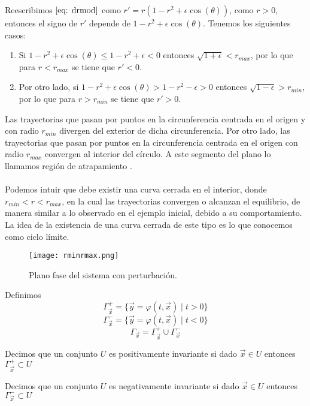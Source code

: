 Reescribimos $\eqref{eq: drmod}$ como $r'=r(1-r^2+\epsilon \cos(\theta))$, como $r>0$,
entonces el signo de $r'$ depende de $1-r^2+\epsilon \cos(\theta)$.
Tenemos los siguientes casos:

\begin{enumerate}
	\item Si $1-r^2+\epsilon\cos(\theta)\leq 1-r^2+\epsilon<0$
	      entonces $\sqrt{1+\epsilon}<r_{max}$, por lo que para $r<r_{max}$ se tiene que $r'<0$.
	\item Por otro lado, si	$1-r^2+\epsilon\cos(\theta)>1-r^2-\epsilon>0$
	      entonces $\sqrt{1-\epsilon}>r_{min}$, por lo que para $r>r_{min}$ se tiene que $r'>0$.
\end{enumerate}

Las trayectorias que pasan por puntos en la circunferencia centrada
en el origen y con radio $r_{min}$
divergen del exterior de dicha circunferencia. Por otro lado,
las trayectorias que pasan por puntos en la circunferencia centrada
en el origen con radio $r_{max}$
convergen al interior del círculo.
A este segmento del plano lo llamamos región de atrapamiento \cite{hinch1991perturbation}.\\
\\Podemos intuir que debe existir
una curva cerrada en el interior, donde $r_{min}<r<r_{max}$, en la cual
las trayectorias convergen o alcanzan el equilibrio, de manera similar
a lo observado en el ejemplo
inicial, debido a su comportamiento. La idea de la existencia de una
curva cerrada de este tipo es lo que conocemos como ciclo límite.
\begin{figure}[h]
	\centering
	\texttt{[image: rminrmax.png]}
	\caption{Plano fase del sistema con perturbación.}
\end{figure}

\newpage

\begin{definition}
	Definimos
	$$\varGamma_{\vec{x}}^{+}=\{\vec{y}=\varphi(t,\vec{x})\mid t>0\}$$
	$$\varGamma_{\vec{x}}^{-}=\{\vec{y}=\varphi(t,\vec{x})\mid t<0\}$$
	$$\varGamma_{\vec{x}}=\varGamma_{\vec{x}}^{+}\cup\varGamma_{\vec{x}}^{-}$$
\end{definition}

\begin{definition}
	Decimos que un conjunto $U$ es positivamente invariante si dado $\vec{x}\in U$ entonces  $\varGamma_{\vec{x}}^{+}\subset U$
\end{definition}

\begin{definition}
	Decimos que un conjunto $U$ es negativamente invariante si dado $\vec{x}\in U$ entonces  $\varGamma_{\vec{x}}^{-}\subset U$
\end{definition}

